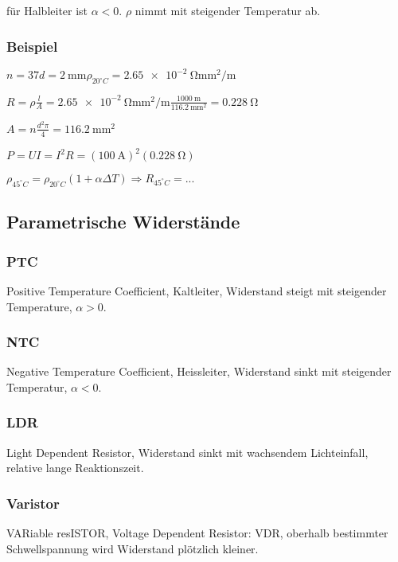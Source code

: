 \documentclass[10pt,a4paper]{scrartcl}
\begin{document}
\begin{multicols*}{3}
	für Halbleiter ist $\alpha<0$. $\rho$ nimmt mit steigender Temperatur ab.
	
	
	 	
	
	\subsubsection{Beispiel}	
	
	$n = 37$\hfill$d=\SI{2}{\milli\meter}$\hfill$\rho_{20^\circ C}=\SI{2.65e-2}{\ohm\milli\meter\squared\per\meter}$
	
	\finn
	
	$R = \rho \frac{l}{A}=\SI{2.65e-2}{\ohm\milli\meter\squared\per\meter}\frac{\SI{1000}{\meter}}{\SI{116.2}{\milli\meter\squared}}=\SI{0.228}{\ohm}$
	
	\finn
	
	$A = n\frac{d^2\pi}{4}=\SI{116.2}{\milli\meter\squared}$
	
	$P=UI=I^2 R=(\SI{100}{\ampere})^2(\SI{0.228}{\ohm})$
	
	$\rho_{45^\circ C}=\rho_{20^\circ C}(1+\alpha \Delta T)\Rightarrow R_{45^\circ C}=...$	
	
	\subsection{Parametrische Widerstände}
	\subsubsection{PTC}
	Positive Temperature Coefficient, Kaltleiter, Widerstand steigt mit steigender Temperature, $\alpha >0$.
	\subsubsection{NTC}
	Negative Temperature Coefficient, Heissleiter, Widerstand sinkt mit steigender Temperatur, $\alpha <0$.
	
	\columnbreak
	
	\subsubsection{LDR}
	Light Dependent Resistor, Widerstand sinkt mit wachsendem Lichteinfall, relative lange Reaktionszeit.
	\subsubsection{Varistor}
	VARiable resISTOR, Voltage Dependent Resistor: VDR, oberhalb bestimmter Schwellspannung wird Widerstand plötzlich kleiner.
		

\end{multicols*}
\end{document}
